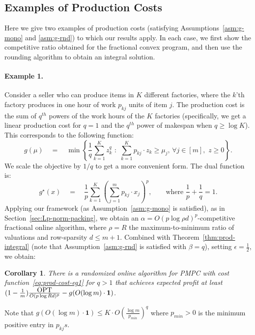 \documentclass[letterpaper,11pt]{article}
\newtheorem{cor}[thm]{Corollary}
\def \OPT  {\mbox{\rm OPT}}
\begin{document}
\subsection{Examples of Production Costs}
Here we give two examples of production costs (satisfying Assumptions~\ref{asm:g-mono} and \ref{asm:g-rnd}) to which our results apply. In each case, we first show the competitive ratio obtained for the fractional convex program, and then use the rounding algorithm to obtain an integral solution.

\paragraph{Example 1.} Consider a seller who can produce items in $K$ different factories, where the $k$'th factory produces in one hour of work $p_{kj}$ units of item $j$. The production cost is the sum of $q^{th}$ powers of the work hours of the $K$ factories (specifically, we get a linear production cost for $q=1$ and the $q^{th}$ power of makespan when $q\geq\log K$).
This corresponds to the following function:
\begin{equation} \label{eq:prod-cost-eg1} g(\mu) \quad =\quad \min \left\{ \frac{1}{q}\sum_{k=1}^K z_k^q\,\, :\,\, \sum_{k=1}^K p_{kj}\cdot z_k \ge \mu_j,\, \forall j\in[m],\,\, z\ge 0\right\}.
\end{equation}
We scale the objective by $1/q$ to get a more convenient form. The dual function is:
$$g^\star(x) \quad =\quad \frac{1}{p}\sum_{k=1}^K \left(\sum_{j=1}^m p_{kj}\cdot x_j\right)^p, \qquad \mbox{where }\frac{1}{p}+\frac1q=1.$$
Applying our framework (as Assumption~\ref{asm:g-mono} is satisfied), as in Section~\ref{sec:Lp-norm-packing}, we obtain an $\alpha= O(p\log\rho d)^p$-competitive fractional online algorithm, where $\rho =R$ the maximum-to-minimum ratio of valuations and row-sparsity $d\le m+1$. Combined with Theorem~\ref{thm:prod-integral} (note that Assumption~\ref{asm:g-rnd} is satisfied with $\beta=q$), setting $\epsilon=\frac12$, we obtain:
\begin{cor}
There is a randomized online algorithm for PMPC with cost function~\eqref{eq:prod-cost-eg1} for $q>1$ that achieves expected profit at least $(1-\frac1m) \frac{\OPT}{O(p\log R d)^p} - g(O(\log m)\cdot \mathbf{1})$.
\end{cor}
Note that $g(O(\log m)\cdot \mathbf{1})\le K\cdot O\left(\frac{\log m}{p_{min}}\right)^q$ where $p_{min}>0$ is the minimum positive entry in $p_{kj}s$.
\end{document}
